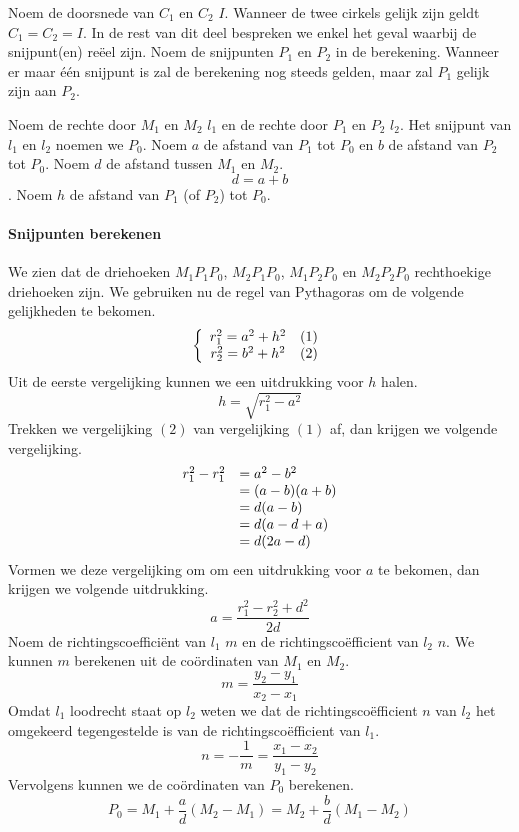 Noem de doorsnede van $C_1$ en $C_2$ $I$. Wanneer de twee cirkels gelijk zijn geldt $C_1 = C_2 = I$.
In de rest van dit deel bespreken we enkel het geval waarbij de snijpunt(en) re\"eel zijn.
Noem de snijpunten $P_1$ en $P_2$ in de berekening.
Wanneer er maar \'e\'en snijpunt is zal de berekening nog steeds gelden, maar zal $P_1$ gelijk zijn aan $P_2$.

Noem de rechte door $M_1$ en $M_2$ $l_1$ en de rechte door $P_1$ en $P_2$ $l_2$.
Het snijpunt van $l_1$ en $l_2$ noemen we $P_0$.
Noem $a$ de afstand van $P_1$ tot $P_0$ en $b$ de afstand van $P_2$ tot $P_0$.
Noem $d$ de afstand tussen $M_1$ en $M_2$.
\[
d = a + b
\]
.
Noem $h$ de afstand van $P_1$ (of $P_2$) tot $P_0$.

\paragraph{Snijpunten berekenen}
We zien dat de driehoeken $M_1P_1P_0$, $M_2P_1P_0$, $M_1P_2P_0$ en $M_2P_2P_0$ rechthoekige driehoeken zijn. We gebruiken nu de regel van Pythagoras om de volgende gelijkheden te bekomen.
\[
\left\{
\begin{array}{c l r}
r_1^2 = a^2 + h^2 & (1)\\
r_2^2 = b^2 + h^2 & (2)
\end{array}
\right.
\]
Uit de eerste vergelijking kunnen we een uitdrukking voor $h$ halen.
\[
h = \sqrt{r_{1}^{2}-a^{2}}
\]
Trekken we vergelijking $(2)$ van vergelijking $(1)$ af, dan krijgen we volgende vergelijking.
\[
\begin{array}{r l}
r_1^2 -r_1^2 & = a^2 - b^2\\
& = (a-b)(a+b)\\
& = d(a-b)\\
& = d(a-d+a)\\
& = d(2a-d)
\end{array}
\]
Vormen we deze vergelijking om om een uitdrukking voor $a$ te bekomen, dan krijgen we volgende uitdrukking.
\[
a = \frac{r_1^2-r_2^2 + d^2}{2d}
\]
Noem de richtingscoeffici\"ent van $l_1$ $m$ en de richtingsco\"efficient van $l_2$ $n$.
We kunnen $m$ berekenen uit de co\"ordinaten van $M_1$ en $M_2$.
\[
m = \frac{y_2-y_1}{x_2-x_1}
\]
Omdat $l_1$ loodrecht staat op $l_2$ weten we dat de richtingsco\"efficient $n$ van $l_2$ het omgekeerd tegengestelde is van de richtingsco\"efficient van $l_1$.
\[
n = -\frac{1}{m} = \frac{x_1-x_2}{y_1-y_2}
\]
Vervolgens kunnen we de co\"ordinaten van $P_0$ berekenen.
\[
P_0 = M_1 + \frac{a}{d}(M_2-M_1) = M_2 + \frac{b}{d}(M_1-M_2)
\]
